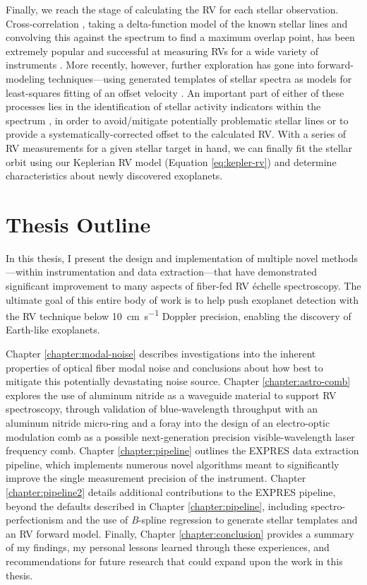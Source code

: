 Finally, we reach the stage of calculating the RV for each stellar observation. Cross-correlation \citep{baranne_coravel_1979}, taking a delta-function model of the known stellar lines and convolving this against the spectrum to find a maximum overlap point, has been extremely popular and successful at measuring RVs for a wide variety of instruments \citep[e.g.][]{freudling_automated_2013, brahm_ceres_2017, modigliani_espresso_2019}. More recently, however, further exploration has gone into forward-modeling techniques---using generated templates of stellar spectra as models for least-squares fitting of an offset velocity \citep[e.g.][]{zechmeister_spectrum_2018, rajpaul_robust_2020}. An important part of either of these processes lies in the identification of stellar activity indicators within the spectrum \citep[e.g.][]{davis_insights_2017, dumusque_measuring_2018}, in order to avoid/mitigate potentially problematic stellar lines or to provide a systematically-corrected offset to the calculated RV. With a series of RV measurements for a given stellar target in hand, we can finally fit the stellar orbit using our Keplerian RV model (Equation \ref{eq:kepler-rv}) and determine characteristics about newly discovered exoplanets.

\section{Thesis Outline} \label{intro:structure}

In this thesis, I present the design and implementation of multiple novel methods---within instrumentation and data extraction---that have demonstrated significant improvement to many aspects of fiber-fed RV \'echelle spectroscopy. The ultimate goal of this entire body of work is to help push exoplanet detection with the RV technique below 10~\si{\centi\meter\per\second} Doppler precision, enabling the discovery of Earth-like exoplanets.

Chapter \ref{chapter:modal-noise} describes investigations into the inherent properties of optical fiber modal noise and conclusions about how best to mitigate this potentially devastating noise source. Chapter \ref{chapter:astro-comb} explores the use of aluminum nitride as a waveguide material to support RV spectroscopy, through validation of blue-wavelength throughput with an aluminum nitride micro-ring and a foray into the design of an electro-optic modulation comb as a possible next-generation precision visible-wavelength laser frequency comb. Chapter \ref{chapter:pipeline} outlines the EXPRES data extraction pipeline, which implements numerous novel algorithms meant to significantly improve the single measurement precision of the instrument. Chapter \ref{chapter:pipeline2} details additional contributions to the EXPRES pipeline, beyond the defaults described in Chapter \ref{chapter:pipeline}, including spectro-perfectionism and the use of \textit{B}-spline regression to generate stellar templates and an RV forward model. Finally, Chapter \ref{chapter:conclusion} provides a summary of my findings, my personal lessons learned through these experiences, and recommendations for future research that could expand upon the work in this thesis.

